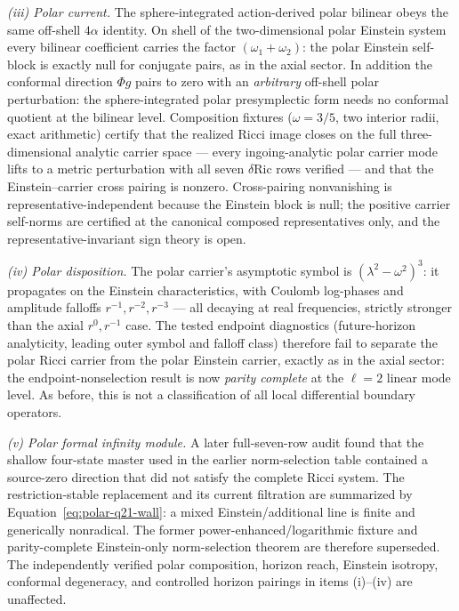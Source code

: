 \documentclass[11pt]{article}
\theoremstyle{definition}
\theoremstyle{remark}
\begin{document}
\emph{(iii) Polar current.}  The sphere-integrated action-derived polar
bilinear obeys the same off-shell \(4\alpha\) identity.  On shell of the
two-dimensional polar Einstein system every bilinear coefficient carries
the factor \((\omega_1+\omega_2)\): the polar Einstein self-block is
exactly null for conjugate pairs, as in the axial sector.  In addition the
conformal direction \(\Phi g\) pairs to zero with an \emph{arbitrary}
off-shell polar perturbation: the sphere-integrated polar presymplectic
form needs no conformal quotient at the bilinear level.  Composition
fixtures (\(\omega=3/5\), two interior radii, exact arithmetic) certify
that the realized Ricci image closes on the full three-dimensional
analytic carrier space --- every ingoing-analytic polar carrier mode lifts
to a metric perturbation with all seven \(\delta\mathrm{Ric}\) rows
verified --- and that the Einstein--carrier cross pairing is nonzero.
Cross-pairing nonvanishing is representative-independent because the
Einstein block is null; the positive carrier self-norms are certified at
the canonical composed representatives only, and the
representative-invariant sign theory is open.

\emph{(iv) Polar disposition.}  The polar carrier's asymptotic symbol is
\((\lambda^2-\omega^2)^3\): it propagates on the Einstein characteristics,
with Coulomb log-phases and amplitude falloffs \(r^{-1},r^{-2},r^{-3}\)
--- all decaying at real frequencies, strictly stronger than the axial
\(r^0,r^{-1}\) case.  The tested endpoint diagnostics (future-horizon
analyticity, leading outer symbol and falloff class) therefore fail to
separate the polar Ricci carrier from the polar Einstein carrier, exactly
as in the axial sector: the endpoint-nonselection result is now
\emph{parity complete} at the \(\ell=2\) linear mode level.  As before,
this is not a classification of all local differential boundary
operators.

\emph{(v) Polar formal infinity module.}  A later full-seven-row audit found
that the shallow four-state master used in the earlier norm-selection table
contained a source-zero direction that did not satisfy the complete Ricci
system.  The restriction-stable replacement and its current filtration are
summarized by Equation~\eqref{eq:polar-q21-wall}: a mixed Einstein/additional line is
finite and generically nonradical.  The former power-enhanced/logarithmic
fixture and parity-complete Einstein-only norm-selection theorem are therefore
superseded.  The independently verified polar composition, horizon reach,
Einstein isotropy, conformal degeneracy, and controlled horizon pairings in
items (i)--(iv) are unaffected.
\end{document}
